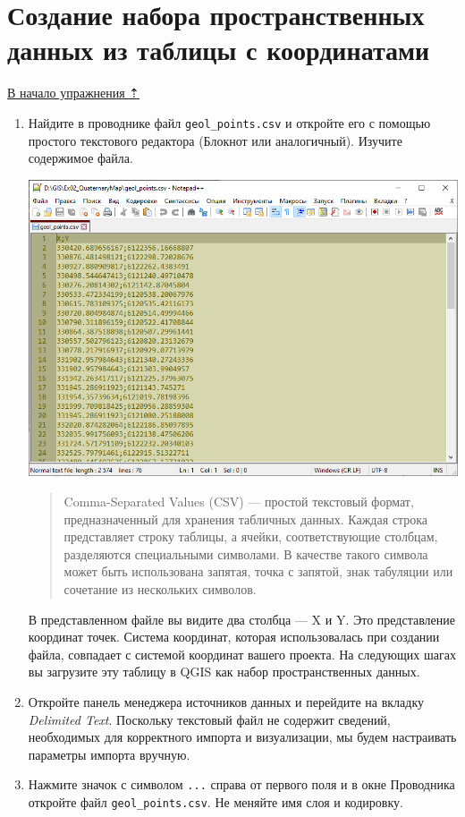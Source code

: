 \documentclass[
  12pt,
]{book}
\begin{document}
\hypertarget{map-design-quaternary-csv}{%
\section{Создание набора пространственных данных из таблицы с координатами}\label{map-design-quaternary-csv}}

\protect\hyperlink{map-design-quaternary}{В начало упражнения ⇡}

\begin{enumerate}
\def\labelenumi{\arabic{enumi}.}
\item
  Найдите в проводнике файл \texttt{geol\_points.csv} и откройте его с помощью простого текстового редактора (Блокнот или аналогичный). Изучите содержимое файла.

  \includegraphics{images/Ex02/csv.png}

  \begin{quote}
  Comma-Separated Values (CSV) --- простой текстовый формат, предназначенный для хранения табличных данных. Каждая строка представляет строку таблицы, а ячейки, соответствующие столбцам, разделяются специальными символами. В качестве такого символа может быть использована запятая, точка с запятой, знак табуляции или сочетание из нескольких символов.
  \end{quote}

  В представленном файле вы видите два столбца --- X и Y. Это представление координат точек. Система координат, которая использовалась при создании файла, совпадает с системой координат вашего проекта. На следующих шагах вы загрузите эту таблицу в QGIS как набор пространственных данных.
\item
  Откройте панель менеджера источников данных и перейдите на вкладку \emph{Delimited Text}. Поскольку текстовый файл не содержит сведений, необходимых для корректного импорта и визуализации, мы будем настраивать параметры импорта вручную.
\item
  Нажмите значок с символом \texttt{...} справа от первого поля и в окне Проводника откройте файл \texttt{geol\_points.csv}. Не меняйте имя слоя и кодировку.


\end{enumerate}
\end{document}
